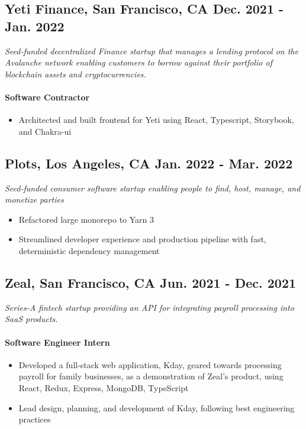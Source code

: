 \documentclass{article}
\begin{document}
	\vspace{14pt}

	\subsection{
		\textbf{Yeti Finance}, San Francisco, CA 
		{\hspace{\fill}\bfseries Dec. 2021 - Jan. 2022}
	}
	{\itshape Seed-funded decentralized Finance startup that manages a lending protocol on the Avalanche network enabling customers to borrow against their portfolio of blockchain assets and cryptocurrencies.}
	\paragraph{Software Contractor}
	\begin{itemize}
		\item Architected and built frontend for Yeti using React, Typescript, Storybook, and Chakra-ui
	\end{itemize}

	\vspace{14pt}

	\subsection{
		\textbf{Plots}, Los Angeles, CA
		{\hspace{\fill}\bfseries Jan. 2022 - Mar. 2022}
	}
	{\itshape Seed-funded consumer software startup enabling people to find, host, manage, and monetize parties}
    \begin{itemize}
		\item Refactored large monorepo to Yarn 3
		\item Streamlined developer experience and production pipeline with fast, deterministic dependency management
	\end{itemize}

	\vspace{14pt}

	\subsection{
		\textbf{Zeal}, San Francisco, CA 
		{\hspace{\fill}\bfseries Jun. 2021 - Dec. 2021}
	}
	{\itshape Series-A fintech startup providing an API for integrating payroll processing into SaaS products.}
	\paragraph{Software Engineer Intern}
	\begin{itemize}
		\item Developed a full-stack web application, Kday, geared towards processing payroll for family businesses, as a demonstration of Zeal’s product, using React, Redux, Express, MongoDB, TypeScript
		\item Lead design, planning, and development of Kday, following best engineering practices
	\end{itemize}
\end{document}
